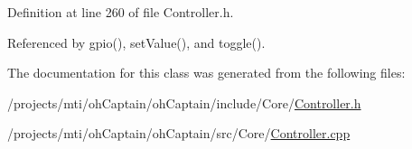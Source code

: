 Definition at line 260 of file Controller.\+h.



Referenced by gpio(), set\+Value(), and toggle().



The documentation for this class was generated from the following files\+:\begin{DoxyCompactItemize}
\item 
/projects/mti/oh\+Captain/oh\+Captain/include/\+Core/\hyperlink{_controller_8h}{Controller.\+h}\item 
/projects/mti/oh\+Captain/oh\+Captain/src/\+Core/\hyperlink{_controller_8cpp}{Controller.\+cpp}\end{DoxyCompactItemize}
